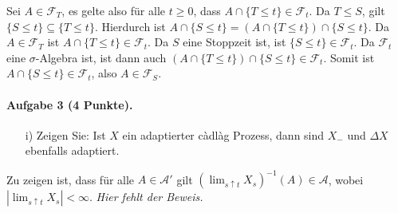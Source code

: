 \documentclass{article}
\begin{document}
Sei $A\in\mathscr{F}_T$, es gelte also für alle $t\geq0$, dass $A\cap\{T\leq t\}\in\mathscr{F}_t$.
Da $T\leq S$, gilt $\{S\leq t\}\subseteq\{T\leq t\}$.
Hierdurch ist $A\cap\{S\leq t\}=(A\cap\{T\leq t\})\cap\{S\leq t\}$.
Da $A\in \mathscr{F}_T$ ist $A\cap\{T\leq t\}\in\mathscr{F}_t$.
Da $S$ eine Stoppzeit ist, ist $\{S\leq t\}\in\mathscr{F}_t$.
Da $\mathscr{F}_t$ eine $\sigma$-Algebra ist, ist dann auch $(A\cap\{T\leq t\})\cap\{S\leq t\}\in\mathscr{F}_t$.
Somit ist $A\cap\{S\leq t\}\in\mathscr{F}_t$, also $A\in\mathscr{F}_S$.

\paragraph{Aufgabe 3 \textnormal{(4 Punkte)}.}
\begin{itemize}
\item [i)] Zeigen Sie: Ist $X$ ein adaptierter càdlàg Prozess, dann sind $X_-$ und $\Delta X$ ebenfalls adaptiert.
\end{itemize}
Zu zeigen ist, dass für alle $A\in\mathscr{A}'$ gilt $(\lim_{s\uparrow t}X_s)^{-1}(A)\in\mathscr{A}$, wobei $|\lim_{s\uparrow t}X_s|<\infty$.
\emph{Hier fehlt der Beweis.}

\end{document}
